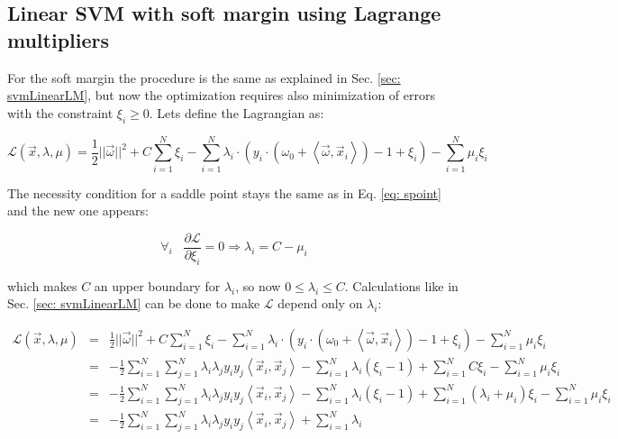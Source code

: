 \subsection{Linear SVM with soft margin using Lagrange multipliers}
\label{sec: svmLinearSoftLM}

For the soft margin the procedure is the same as explained in Sec. \ref{sec: svmLinearLM}, but now the optimization requires also minimization of errors with the constraint $\xi_i \geq 0$. Lets define the Lagrangian as:

\begin{equation} 
  \mathcal{L} (\vec x, \lambda, \mu) = \frac{1}{2}||\vec\omega||^2 + C\sum_{i=1}^N\xi_i - \sum_{i=1}^N \lambda_i \cdot \left(y_i \cdot \left(\omega_0 + \left<\vec\omega, \vec x_i\right>\right) - 1 + \xi_i\right) - \sum_{i=1}^N\mu_i\xi_i
  \label{eq: svmSoftL}
\end{equation}

The necessity condition for a saddle point stays the same as in Eq. \ref{eq: spoint} and the new one appears:

\begin{equation}
 \forall_i \hspace{10pt} \frac{\partial\mathcal{L}}{\partial\xi_i} = 0 \Rightarrow \lambda_i = C - \mu_i
\end{equation}

which makes $C$ an upper boundary for $\lambda_i$, so now $0 \leq \lambda_i \leq C$. Calculations like in Sec. \ref{sec: svmLinearLM} can be done to make $\mathcal{L}$ depend only on $\lambda_i$:

\begin{eqnarray}
  \mathcal{L} (\vec x, \lambda, \mu) & = & \frac{1}{2}||\vec\omega||^2 + C\sum_{i=1}^N\xi_i - \sum_{i=1}^N \lambda_i \cdot \left(y_i \cdot \left(\omega_0 + \left<\vec\omega, \vec x_i\right>\right) - 1 + \xi_i\right) - \sum_{i=1}^N\mu_i\xi_i \nonumber \\
  & = & -\frac{1}{2}\sum_{i=1}^N\sum_{j=1}^N\lambda_i\lambda_jy_iy_j\left<\vec x_i, \vec x_j\right> - \sum_{i=1}^{N}\lambda_i (\xi_i - 1) + \sum_{i=1}^NC\xi_i - \sum_{i=1}^N\mu_i\xi_i \nonumber \\
  & = & -\frac{1}{2}\sum_{i=1}^N\sum_{j=1}^N\lambda_i\lambda_jy_iy_j\left<\vec x_i, \vec x_j\right> - \sum_{i=1}^{N}\lambda_i (\xi_i - 1) + \sum_{i=1}^N(\lambda_i + \mu_i)\xi_i - \sum_{i=1}^N\mu_i\xi_i \nonumber \\
  & = & -\frac{1}{2}\sum_{i=1}^N\sum_{j=1}^N\lambda_i\lambda_jy_iy_j\left<\vec x_i, \vec x_j\right> + \sum_{i=1}^{N}\lambda_i
\end{eqnarray}

